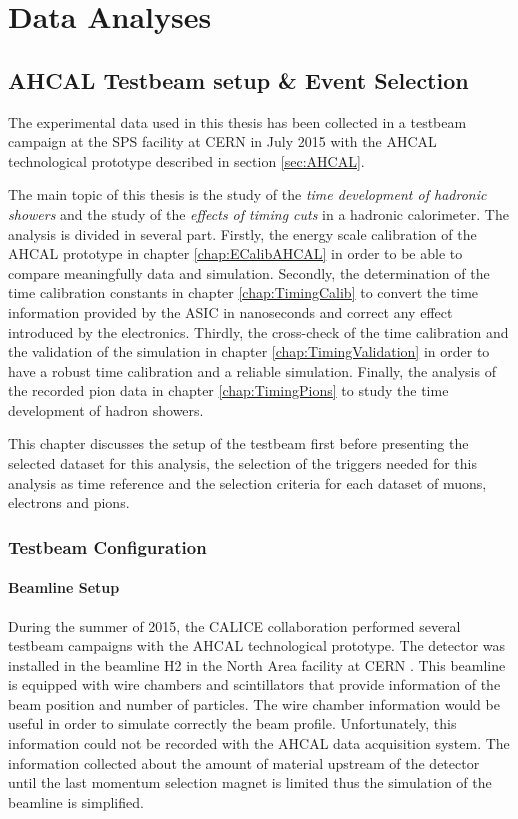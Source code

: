 \part{Data Analyses}
\label{chap:TimingAHCAL}

\chapter{AHCAL Testbeam setup \& Event Selection}
\label{chap:EvtSelection}

The experimental data used in this thesis has been collected in a testbeam campaign at the SPS facility at CERN in July 2015 with the AHCAL technological prototype described in section \ref{sec:AHCAL}.

The main topic of this thesis is the study of the \textit{time development of hadronic showers} and the study of the \textit{effects of timing cuts} in a hadronic calorimeter. The analysis is divided in several part. Firstly, the energy scale calibration of the AHCAL prototype in chapter \ref{chap:ECalibAHCAL} in order to be able to compare meaningfully data and simulation. Secondly, the determination of the time calibration constants in chapter \ref{chap:TimingCalib} to convert the time information provided by the ASIC in nanoseconds and correct any effect introduced by the electronics. Thirdly, the cross-check of the time calibration and the validation of the simulation in chapter \ref{chap:TimingValidation} in order to have a robust time calibration and a reliable simulation. Finally, the analysis of the recorded pion data in chapter \ref{chap:TimingPions} to study the time development of hadron showers.

This chapter discusses the setup of the testbeam first before presenting the selected dataset for this analysis, the selection of the triggers needed for this analysis as time reference and the selection criteria for each dataset of muons, electrons and pions.

\section{Testbeam Configuration}

\subsection{Beamline Setup}
\label{sec:beamline}

During the summer of 2015, the CALICE collaboration performed several testbeam campaigns with the AHCAL technological prototype. The detector was installed in the beamline H2 in the North Area facility at CERN \cite{H2Beamline}. This beamline is equipped with wire chambers and scintillators that provide information of the beam position and number of particles. The wire chamber information would be useful in order to simulate correctly the beam profile. Unfortunately, this information could not be recorded with the AHCAL data acquisition system. The information collected about the amount of material upstream of the detector until the last momentum selection magnet is limited thus the simulation of the beamline is simplified.

